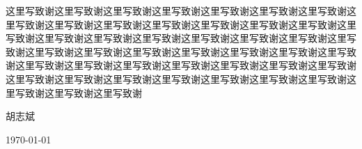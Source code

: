 \documentclass[UTF8,12pt,a4paper]{ctexart}
\begin{document}
这里写致谢这里写致谢这里写致谢这里写致谢这里写致谢这里写致谢这里写致谢这里写致谢这里写致谢这里写致谢这里写致谢这里写致谢这里写致谢这里写致谢这里写致谢这里写致谢这里写致谢这里写致谢这里写致谢这里写致谢这里写致谢这里写致谢这里写致谢这里写致谢这里写致谢这里写致谢这里写致谢这里写致谢这里写致谢这里写致谢这里写致谢这里写致谢这里写致谢这里写致谢这里写致谢这里写致谢这里写致谢这里写致谢这里写致谢这里写致谢这里写致谢这里写致谢这里写致谢这里写致谢这里写致谢这里写致谢


\begin{flushright}
	胡志斌\hspace*{2.2em}

	\today
\end{flushright}
\newpage
\pagestyle{fancy}
\renewcommand{\headrulewidth}{0pt}
\fancyfoot[CO,CE]{\thepage}
\end{document}
